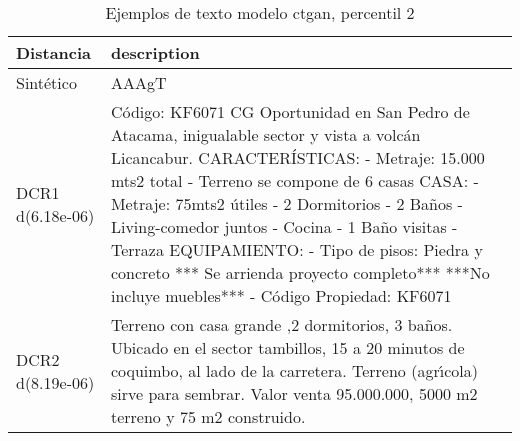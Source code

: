 \begin{table}[H]
\centering
\fontsize{10}{14}\selectfont
\caption{Ejemplos de texto modelo ctgan, percentil 2}
\label{table-example-economicos-a-2-ctgan-2p-text}
\begin{tabular}{|l|m{35em}|}
\hline
\rowcolor[gray]{0.8}
Distancia & description \\
\hline Sintético & AAAgT \\
\hline DCR1 d(6.18e-06) & C\'odigo: KF6071 CG  Oportunidad en San Pedro de Atacama, inigualable sector y vista a volc\'an Licancabur.  CARACTER\'ISTICAS: - Metraje: 15.000 mts2 total - Terreno se compone de 6 casas  CASA: -Metraje:  75mts2 \'utiles - 2 Dormitorios - 2 Ba\~nos - Living-comedor juntos - Cocina - 1 Ba\~no visitas - Terraza  EQUIPAMIENTO: - Tipo de pisos: Piedra y concreto   *** Se arrienda proyecto completo*** ***No incluye muebles*** - C\'odigo Propiedad: KF6071 \\
\hline DCR2 d(8.19e-06) & Terreno con casa grande ,2 dormitorios, 3 ba\~nos. Ubicado en el sector tambillos, 15 a 20 minutos de coquimbo, al lado de la carretera. Terreno (agr{\'\i}cola) sirve para sembrar. Valor venta 95.000.000, 5000 m2 terreno y 75 m2 construido. \\
\hline
\end{tabular}
\end{table}

